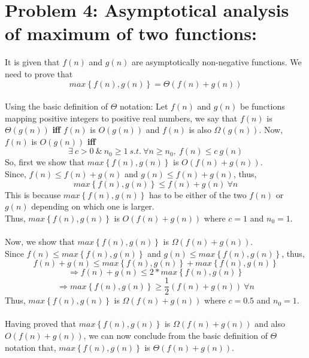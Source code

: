 \documentclass[12pt]{report}
\begin{document}
\section{Problem 4: Asymptotical analysis of maximum of two functions:}
It is given that $f(n)$ and $g(n)$ are asymptotically non-negative functions. We need to prove that 
\[max\left \{ f(n), g(n) \right \} = \Theta (f(n) + g(n))\]
\\
Using the basic definition of $\Theta$ notation: 
Let $f(n)$ and $g(n)$ be functions mapping positive integers to positive real numbers, we say that $f(n)$ is $\Theta(g(n))$ \textbf{iff} $f(n)$ is $O(g(n))$ and $f(n)$ is also $\Omega(g(n))$. 
Now, $f(n)$ is $O(g(n))$ \textbf{iff} 
\[\exists\ c > 0 \ \& \ n_{0} \geq 1 \ s.t. \ \forall n \geq n_{0}, \ f(n) \leq c \ g(n)\]
So, first we show that $max\left \{ f(n), g(n) \right \}$ is $O(f(n) + g(n))$. 
\\
Since, $f(n) \leq f(n) + g(n)$ and $g(n) \leq f(n) + g(n)$, thus, 
\[max\left \{ f(n), g(n) \right \} \leq f(n) + g(n) \ \forall n\]
This is because $max\left \{ f(n), g(n) \right \}$ has to be either of the two $f(n)$ or $g(n)$ depending on which one is larger. 
\\
Thus, $max\left \{ f(n), g(n) \right \}$ is $O(f(n) + g(n))$ where $c = 1$ and $n_{0} = 1$.
\\
\\
Now, we show that $max\left \{ f(n), g(n) \right \}$ is $\Omega(f(n) + g(n))$. 
\\
Since $f(n) \leq max\left \{ f(n), g(n) \right \}$ and $g(n) \leq max\left \{ f(n), g(n) \right \}$, thus, 
\[f(n) + g(n) \leq max\left \{ f(n), g(n) \right \} + max\left \{ f(n), g(n) \right \}\]
\[\Rightarrow f(n) + g(n) \leq 2*max\left \{ f(n), g(n) \right \}\]
\[\Rightarrow max\left \{ f(n), g(n) \right \} \geq \frac{1}{2} (f(n) + g(n)) \ \forall n\]
Thus, $max\left \{ f(n), g(n) \right \}$ is $\Omega(f(n) + g(n))$ where $c = 0.5$ and $n_{0} = 1$.
\\ \\
Having proved that $max\left \{ f(n), g(n) \right \}$ is $\Omega(f(n) + g(n))$ and also $O(f(n) + g(n))$, we can now conclude from the basic definition of $\Theta$ notation that, $max\left \{ f(n), g(n) \right \}$ is $\Theta(f(n) + g(n))$.

\end{document}
